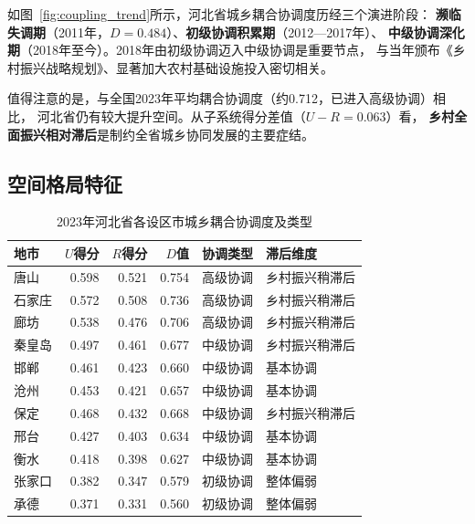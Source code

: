 \documentclass[12pt, a4paper, twoside]{ctexart}
\begin{document}
如图~\ref{fig:coupling_trend}所示，河北省城乡耦合协调度历经三个演进阶段：
\textbf{濒临失调期}（2011年，$D=0.484$）、\textbf{初级协调积累期}（2012—2017年）、
\textbf{中级协调深化期}（2018年至今）。2018年由初级协调迈入中级协调是重要节点，
与当年颁布《乡村振兴战略规划》、显著加大农村基础设施投入密切相关。

值得注意的是，与全国2023年平均耦合协调度（约0.712，已进入高级协调）相比，
河北省仍有较大提升空间。从子系统得分差值（$U-R=0.063$）看，
\textbf{乡村全面振兴相对滞后}是制约全省城乡协同发展的主要症结。

\subsection{空间格局特征}

\begin{table}[H]
  \centering
  \caption{2023年河北省各设区市城乡耦合协调度及类型}
  \label{tab:spatial}
  \begin{tabularx}{\linewidth}{l r
      r r X X}
    \toprule
    \rowcolor{TableHead}
    \color{white}\bfseries 地市 &
    \color{white}\bfseries $U$得分 &
    \color{white}\bfseries $R$得分 &
    \color{white}\bfseries $D$值 &
    \color{white}\bfseries 协调类型 &
    \color{white}\bfseries 滞后维度 \\
    \midrule
    唐山   & 0.598 & 0.521 & 0.754 & 高级协调 & 乡村振兴稍滞后 \\
    \rowcolor{TableRow}
    石家庄 & 0.572 & 0.508 & 0.736 & 高级协调 & 乡村振兴稍滞后 \\
    廊坊   & 0.538 & 0.476 & 0.706 & 高级协调 & 乡村振兴稍滞后 \\
    \rowcolor{TableRow}
    秦皇岛 & 0.497 & 0.461 & 0.677 & 中级协调 & 乡村振兴稍滞后 \\
    邯郸   & 0.461 & 0.423 & 0.660 & 中级协调 & 基本协调 \\
    \rowcolor{TableRow}
    沧州   & 0.453 & 0.421 & 0.657 & 中级协调 & 基本协调 \\
    保定   & 0.468 & 0.432 & 0.668 & 中级协调 & 乡村振兴稍滞后 \\
    \rowcolor{TableRow}
    邢台   & 0.427 & 0.403 & 0.634 & 中级协调 & 基本协调 \\
    衡水   & 0.418 & 0.398 & 0.627 & 中级协调 & 基本协调 \\
    \rowcolor{TableRow}
    张家口 & 0.382 & 0.347 & 0.579 & 初级协调 & 整体偏弱 \\
    承德   & 0.371 & 0.331 & 0.560 & 初级协调 & 整体偏弱 \\
    \bottomrule
  \end{tabularx}
\end{table}
\end{document}
